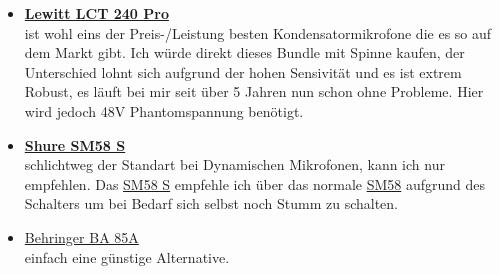 \begin{itemize}
    \item \textbf{\href{https://www.thomann.de/de/lewitt_lct_240_pro_bk_bundle.htm}{Lewitt LCT 240 Pro}}\\    ist wohl eins der Preis-/Leistung besten Kondensatormikrofone die es so auf dem Markt gibt. Ich würde direkt dieses Bundle mit Spinne kaufen, der Unterschied lohnt sich aufgrund der hohen Sensivität und es ist extrem Robust, es läuft bei mir seit über 5 Jahren nun schon ohne Probleme. Hier wird jedoch 48V Phantomspannung benötigt. 
    \item \textbf{\href{https://www.thomann.de/de/shure_sm58s.htm}{Shure SM58 S}}\\ schlichtweg der Standart bei Dynamischen Mikrofonen, kann ich nur empfehlen. Das \href{https://www.thomann.de/de/shure_sm58s.htm}{SM58 S} empfehle ich über das normale \href{https://www.thomann.de/de/shure_sm58.htm}{SM58} aufgrund des Schalters um bei Bedarf sich selbst noch Stumm zu schalten. 
    \item \href{https://www.thomann.de/de/behringer_ba_85a.htm}{Behringer BA 85A} \\ einfach eine günstige Alternative.

\end{itemize}


